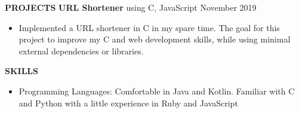 \documentclass[10pt, a4paper]{article}
\begin{document}
\textbf{PROJECTS}
\smallskip 
\newline
\textbf{URL Shortener} using C, JavaScript \hfill November 2019
\begin{itemize}
\item Implemented a URL shortener in C in my spare time. The goal for this project to improve my C and web development skills, while using minimal external dependencies or libraries.
\end{itemize}

\textbf{SKILLS}
\smallskip 
\begin{itemize}
\item Programming Languages: Comfortable in Java and Kotlin. Familiar with C and Python with a little experience in Ruby and JavaScript
\end{itemize} 

\end{document}
